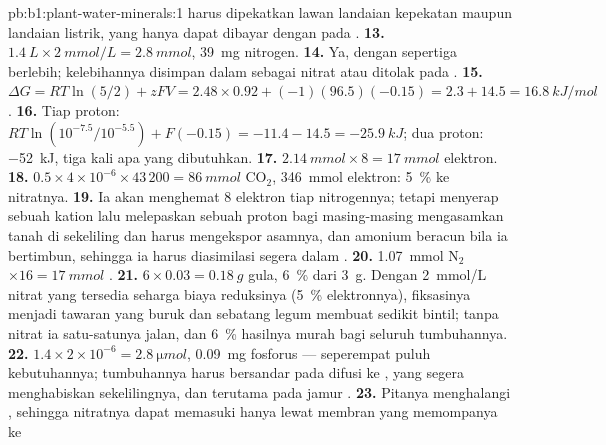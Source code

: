 \begin{solution}{pb:b1:plant-water-minerals:1}
harus dipekatkan lawan landaian kepekatan maupun landaian listrik,
yang hanya dapat dibayar dengan  pada .
\textbf{13.} $\qty{1.4}{L}\times\qty{2}{mmol/L} = \qty{2.8}{mmol}$,
\qty{39}{mg} nitrogen.
\textbf{14.} Ya, dengan sepertiga berlebih; kelebihannya disimpan
dalam  sebagai nitrat atau ditolak pada .
\textbf{15.} $\Delta G = RT\ln(5/2) + zFV = 2.48\times 0.92 + (-1)(96.5)(-0.15)
= 2.3 + 14.5 = \qty{16.8}{kJ/mol}$.
\textbf{16.} Tiap proton: $RT\ln(10^{-7.5}/10^{-5.5}) + F(-0.15) =
-11.4 - 14.5 = \qty{-25.9}{kJ}$; dua proton: \qty{-52}{kJ}, tiga kali
apa yang dibutuhkan.
\textbf{17.} $\qty{2.14}{mmol}\times 8 = \qty{17}{mmol}$ elektron.
\textbf{18.} $0.5\times 4\times 10^{-6}\times 43\,200 = \qty{86}{mmol}$
$\mathrm{CO_2}$, \qty{346}{mmol} elektron: \qty{5}{\%} ke nitratnya.
\textbf{19.} Ia akan menghemat 8 elektron tiap nitrogennya; tetapi
menyerap sebuah kation lalu melepaskan sebuah proton bagi
masing-masing mengasamkan tanah di sekeliling  dan  harus
mengekspor asamnya, dan amonium beracun bila ia bertimbun, sehingga ia
harus diasimilasi segera dalam .
\textbf{20.} \qty{1.07}{mmol} $\mathrm{N_2}$ $\times 16 =
\qty{17}{mmol}$ .
\textbf{21.} $6\times 0.03 = \qty{0.18}{g}$ gula, \qty{6}{\%} dari
\qty{3}{g}. Dengan \qty{2}{mmol/L} nitrat yang tersedia seharga biaya
reduksinya (\qty{5}{\%} elektronnya), fiksasinya menjadi tawaran yang
buruk dan sebatang legum membuat sedikit bintil; tanpa nitrat ia
satu-satunya jalan, dan \qty{6}{\%} hasilnya murah bagi seluruh 
tumbuhannya.
\textbf{22.} $1.4\times 2\times 10^{-6} = \qty{2.8}{\micro mol}$,
\qty{0.09}{mg} fosforus --- seperempat puluh kebutuhannya; tumbuhannya
harus bersandar pada difusi ke , yang segera menghabiskan
sekelilingnya, dan terutama pada jamur .
\textbf{23.} Pitanya menghalangi , sehingga nitratnya dapat
memasuki  hanya lewat membran  yang memompanya ke

\end{solution}
